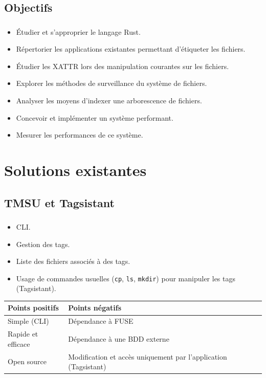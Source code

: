 \documentclass[10pt]{beamer}
\begin{document}
\subsection{Objectifs}
\begin{frame}
    \frametitle{\subsecname}
    \begin{itemize}
        \item Étudier et s'approprier le langage Rust.
        \pause
        \item Répertorier les applications existantes permettant d'étiqueter les fichiers.
        \pause
        \item Étudier les XATTR lors des manipulation courantes sur les fichiers.
        \pause
        \item Explorer les méthodes de surveillance du système de fichiers.
        \pause
        \item Analyser les moyens d'indexer une arborescence de fichiers.
        \pause
        \item Concevoir et implémenter un système performant.
        \pause
        \item Mesurer les performances de ce système.
    \end{itemize}
\end{frame}

\section{Solutions existantes}
\subsection{TMSU et Tagsistant}
\begin{frame}
    \frametitle{\subsecname}
    \begin{itemize}
        \item CLI.
        \item Gestion des tags.
        \item Liste des fichiers associés à des tags.
        \item Usage de commandes usuelles (\texttt{cp}, \texttt{ls}, 
            \texttt{mkdir}) pour manipuler les tags (Tagsistant).
    \end{itemize}
    \pause
    \begin{center}
        \begin{tabularx}{8cm}{|X|X|} \hline
            \textbf{Points positifs} & \textbf{Points négatifs} \\ \hline
            Simple (CLI) & Dépendance à FUSE \\ \hline
            Rapide et efficace & Dépendance à une BDD externe \\ \hline
            Open source & Modification et accès uniquement par l'application (Tagsistant) \\ \hline
        \end{tabularx}
    \end{center}
\end{frame}
\end{document}
